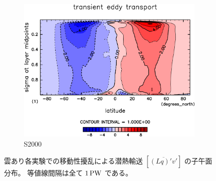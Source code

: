 \documentclass[body]{subfiles}
\begin{document}
\begin{figure}[t]
\begin{subfigure}{.4\textwidth}
		\includegraphics[width=\textwidth]{S2000/MeriHeatTransTest@latentEn_TE,time=7300:7665-crop-rotate.pdf}
		\caption{S2000}\label{潜熱移動性擾乱S2000}
	\end{subfigure}
	\caption[雲あり各実験での移動性擾乱による潜熱輸送の子午面分布]{
		雲あり各実験での移動性擾乱による潜熱輸送 \([\overline{(Lq)'v'}]\) の子午面分布。
		等値線間隔は全て \(1\hmu{PW}\) である。
	}\label{潜熱移動性擾乱}
\end{figure}
\end{document}
